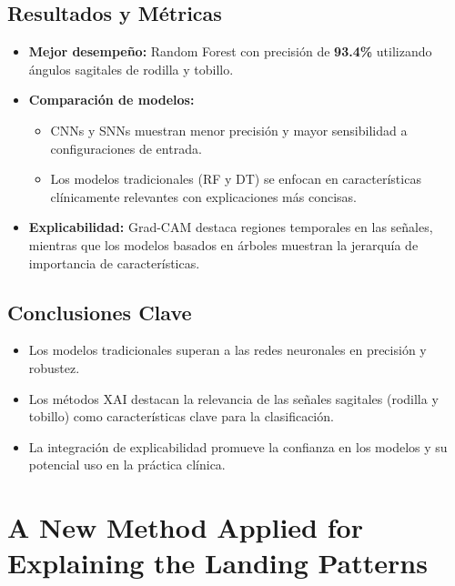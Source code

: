 \documentclass{report}
\begin{document}
\subsection{Resultados y Métricas}
\begin{itemize}
    \item \textbf{Mejor desempeño:} Random Forest con precisión de \textbf{93.4\%} utilizando ángulos sagitales de rodilla y tobillo.
    \item \textbf{Comparación de modelos:} 
    \begin{itemize}
        \item CNNs y SNNs muestran menor precisión y mayor sensibilidad a configuraciones de entrada.
        \item Los modelos tradicionales (RF y DT) se enfocan en características clínicamente relevantes con explicaciones más concisas.
    \end{itemize}
    \item \textbf{Explicabilidad:} Grad-CAM destaca regiones temporales en las señales, mientras que los modelos basados en árboles muestran la jerarquía de importancia de características.
\end{itemize}

\subsection{Conclusiones Clave}
\begin{itemize}
    \item Los modelos tradicionales superan a las redes neuronales en precisión y robustez.
    \item Los métodos XAI destacan la relevancia de las señales sagitales (rodilla y tobillo) como características clave para la clasificación.
    \item La integración de explicabilidad promueve la confianza en los modelos y su potencial uso en la práctica clínica.
\end{itemize}


\section{A New Method Applied for Explaining the Landing Patterns}
\end{document}
